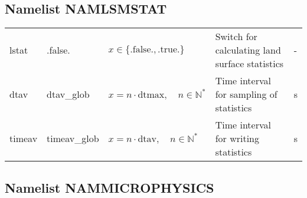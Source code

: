 \documentclass[twoside,11pt,fleqn,a4paper,english,openright]{report}
\begin{document}
\subsection{Namelist NAMLSMSTAT}\label{par:lsmstat}
\begin{center}
  \tablelasttail{
        &&&&\\\hline
  }
\begin{supertabular}{|l|p{2cm}|p{4cm}|p{6cm}|l|}
  lstat		& .false.	& $x\in\{\text{.false.},\text{.true.}\}$	& Switch for calculating land surface statistics	& -\\
  dtav		& dtav\_glob	& $x = n \cdot \text{dtmax}, \quad n \in \mathbb{N}^*$	& Time interval for sampling of statistics	& s\\
  timeav	& timeav\_glob	& $x = n \cdot \text{dtav}, \quad n \in \mathbb{N}^*$	& Time interval for writing statistics		& s\\
\end{supertabular}
\end{center}

\subsection{Namelist NAMMICROPHYSICS}\label{par:microphysics}
\end{document}

